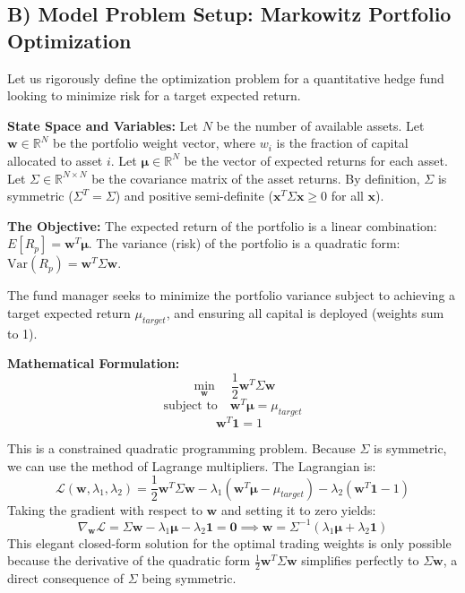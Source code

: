 \documentclass[11pt, letterpaper]{article}
\theoremstyle{definition}
\theoremstyle{remark}
\newcommand{\R}{\mathbb{R}}
\begin{document}
\subsection{B) Model Problem Setup: Markowitz Portfolio Optimization}
Let us rigorously define the optimization problem for a quantitative hedge fund looking to minimize risk for a target expected return.

\textbf{State Space and Variables:}
Let $N$ be the number of available assets.
Let $\mathbf{w} \in \R^N$ be the portfolio weight vector, where $w_i$ is the fraction of capital allocated to asset $i$.
Let $\boldsymbol{\mu} \in \R^N$ be the vector of expected returns for each asset.
Let $\Sigma \in \R^{N \times N}$ be the covariance matrix of the asset returns. By definition, $\Sigma$ is symmetric ($\Sigma^T = \Sigma$) and positive semi-definite ($\mathbf{x}^T \Sigma \mathbf{x} \geq 0$ for all $\mathbf{x}$).

\textbf{The Objective:}
The expected return of the portfolio is a linear combination: $E[R_p] = \mathbf{w}^T \boldsymbol{\mu}$.
The variance (risk) of the portfolio is a quadratic form: $\text{Var}(R_p) = \mathbf{w}^T \Sigma \mathbf{w}$.

The fund manager seeks to minimize the portfolio variance subject to achieving a target expected return $\mu_{target}$, and ensuring all capital is deployed (weights sum to 1).

\textbf{Mathematical Formulation:}
\[ \min_{\mathbf{w}} \quad \frac{1}{2} \mathbf{w}^T \Sigma \mathbf{w} \]
\[ \text{subject to} \quad \mathbf{w}^T \boldsymbol{\mu} = \mu_{target} \]
\[ \quad \mathbf{w}^T \mathbf{1} = 1 \]

This is a constrained quadratic programming problem. Because $\Sigma$ is symmetric, we can use the method of Lagrange multipliers. The Lagrangian is:
\[ \mathcal{L}(\mathbf{w}, \lambda_1, \lambda_2) = \frac{1}{2} \mathbf{w}^T \Sigma \mathbf{w} - \lambda_1 (\mathbf{w}^T \boldsymbol{\mu} - \mu_{target}) - \lambda_2 (\mathbf{w}^T \mathbf{1} - 1) \]
Taking the gradient with respect to $\mathbf{w}$ and setting it to zero yields:
\[ \nabla_{\mathbf{w}} \mathcal{L} = \Sigma \mathbf{w} - \lambda_1 \boldsymbol{\mu} - \lambda_2 \mathbf{1} = \mathbf{0} \implies \mathbf{w} = \Sigma^{-1} (\lambda_1 \boldsymbol{\mu} + \lambda_2 \mathbf{1}) \]
This elegant closed-form solution for the optimal trading weights is only possible because the derivative of the quadratic form $\frac{1}{2}\mathbf{w}^T \Sigma \mathbf{w}$ simplifies perfectly to $\Sigma \mathbf{w}$, a direct consequence of $\Sigma$ being symmetric.
\end{document}
